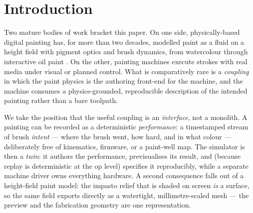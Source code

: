 \documentclass[11pt]{article}
\begin{document}
\section{Introduction}

Two mature bodies of work bracket this paper. On one side, physically-based
digital painting has, for more than two decades, modelled paint as a fluid on a
height field with pigment optics and brush dynamics, from watercolour
\citep{curtis1997watercolor} through interactive oil paint
\citep{baxter2004impasto,chen2015wetbrush,stuyck2016oilmobile}. On the other,
painting machines execute strokes with real media under visual or planned
control. What is comparatively rare is a \emph{coupling} in which the paint
physics is the authoring front-end for the machine, and the machine consumes a
physics-grounded, reproducible description of the intended painting rather than a
bare toolpath.

We take the position that the useful coupling is an \emph{interface}, not a
monolith. A painting can be recorded as a deterministic \emph{performance}: a
timestamped stream of brush \emph{intent} --- where the brush went, how hard, and
in what colour --- deliberately free of kinematics, firmware, or a paint-well
map. The simulator is then a \emph{twin}: it authors the performance, previsualises
its result, and (because replay is deterministic at the op level) specifies it
reproducibly, while a separate machine driver owns everything hardware. A second
consequence falls out of a height-field paint model: the impasto relief that is
shaded on screen \emph{is} a surface, so the same field exports directly as a
watertight, millimetre-scaled mesh --- the preview and the fabrication geometry
are one representation.
\end{document}
